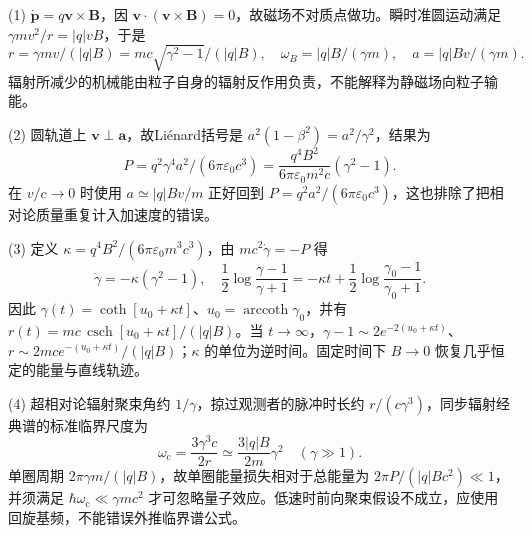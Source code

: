 (1) \(\dot{\boldsymbol p}=q\boldsymbol v\times\boldsymbol B\)，因 \(\boldsymbol v\cdot(\boldsymbol v\times\boldsymbol B)=0\)，故磁场不对质点做功。瞬时准圆运动满足 \(\gamma mv^2/r=|q|vB\)，于是
\[
r=\gamma mv/(|q|B)=mc\sqrt{\gamma^2-1}/(|q|B),\quad
\omega_B=|q|B/(\gamma m),\quad a=|q|Bv/(\gamma m).
\]
辐射所减少的机械能由粒子自身的辐射反作用负责，不能解释为静磁场向粒子输能。

(2) 圆轨道上 \(\boldsymbol v\perp\boldsymbol a\)，故Liénard括号是 \(a^2(1-\beta^2)=a^2/\gamma^2\)，结果为
\[
\boxed{P=q^2\gamma^4a^2/(6\pi\varepsilon_0c^3)
=\frac{q^4B^2}{6\pi\varepsilon_0m^2c}(\gamma^2-1)}.
\]
在 \(v/c\to0\) 时使用 \(a\simeq |q|Bv/m\) 正好回到 \(P=q^2a^2/(6\pi\varepsilon_0c^3)\)，这也排除了把相对论质量重复计入加速度的错误。

(3) 定义 \(\kappa=q^4B^2/(6\pi\varepsilon_0m^3c^3)\)，由 \(mc^2\dot\gamma=-P\) 得
\[
\dot\gamma=-\kappa(\gamma^2-1),\quad
\frac12\log\frac{\gamma-1}{\gamma+1}=-\kappa t+\frac12\log\frac{\gamma_0-1}{\gamma_0+1}.
\]
因此 \(\gamma(t)=\coth[u_0+\kappa t]\)、\(u_0=\operatorname{arccoth}\gamma_0\)，并有 \(r(t)=mc\,\operatorname{csch}[u_0+\kappa t]/(|q|B)\)。当 \(t\to\infty\)，\(\gamma-1\sim2e^{-2(u_0+\kappa t)}\)、\(r\sim2mc e^{-(u_0+\kappa t)}/(|q|B)\)；\(\kappa\) 的单位为逆时间。固定时间下 \(B\to0\) 恢复几乎恒定的能量与直线轨迹。

(4) 超相对论辐射聚束角约 \(1/\gamma\)，掠过观测者的脉冲时长约 \(r/(c\gamma^3)\)，同步辐射经典谱的标准临界尺度为
\[
\omega_{\mathrm c}=\frac{3\gamma^3c}{2r}\simeq\frac{3|q|B}{2m}\gamma^2\quad(\gamma\gg1).
\]
单圈周期 \(2\pi\gamma m/(|q|B)\)，故单圈能量损失相对于总能量为 \(2\pi P/(|q|Bc^2)\ll1\)，并须满足 \(\hbar\omega_{\mathrm c}\ll\gamma mc^2\) 才可忽略量子效应。低速时前向聚束假设不成立，应使用回旋基频，不能错误外推临界谱公式。
